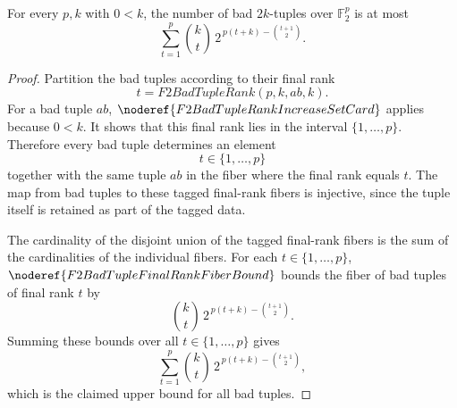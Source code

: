 \begin{helper}
For every \(p,k\) with \(0<k\), the number of bad \(2k\)-tuples over
\(\mathbb F_2^p\) is at most
\[
  \sum_{t=1}^p
    \binom{k}{t}\,
    2^{\,p(t+k)-\binom{t+1}{2}}.
\]
\end{helper}
\begin{proof}
Partition the bad tuples according to their final rank
\[
  t=F2BadTupleRank(p,k,ab,k).
\]
For a bad tuple \(ab\), \(\noderef{F2BadTupleRankIncreaseSetCard}\) applies
because \(0<k\). It shows that this final rank lies in the interval
\(\{1,\ldots,p\}\). Therefore every bad tuple determines an element
\[
  t\in\{1,\ldots,p\}
\]
together with the same tuple \(ab\) in the fiber where the final rank equals
\(t\). The map from bad tuples to these tagged final-rank fibers is injective,
since the tuple itself is retained as part of the tagged data.

The cardinality of the disjoint union of the tagged final-rank fibers is the
sum of the cardinalities of the individual fibers. For each
\(t\in\{1,\ldots,p\}\), \(\noderef{F2BadTupleFinalRankFiberBound}\) bounds the
fiber of bad tuples of final rank \(t\) by
\[
  \binom{k}{t}\,
  2^{\,p(t+k)-\binom{t+1}{2}}.
\]
Summing these bounds over all \(t\in\{1,\ldots,p\}\) gives
\[
  \sum_{t=1}^p
    \binom{k}{t}\,
    2^{\,p(t+k)-\binom{t+1}{2}},
\]
which is the claimed upper bound for all bad tuples.
\end{proof}
